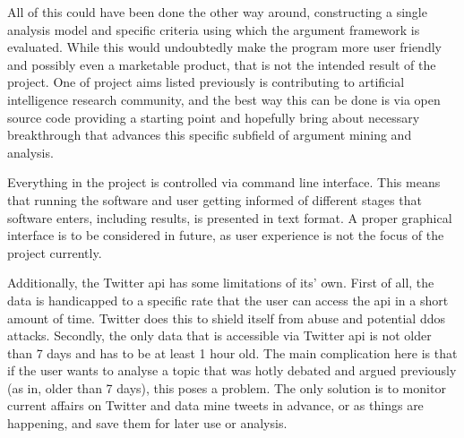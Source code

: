         All of this could have been done the other way around, constructing a single analysis model and specific criteria using which the argument framework is evaluated. While this would undoubtedly make the program more user friendly and possibly even a marketable product, that is not the intended result of the project. One of project aims listed previously is contributing to artificial intelligence research community, and the best way this can be done is via open source code providing a starting point and hopefully bring about necessary breakthrough that advances this specific subfield of argument mining and analysis.

        Everything in the project is controlled via command line interface. This means that running the software and user getting informed of different stages that software enters, including results, is presented in text format. A proper graphical interface is to be considered in future, as user experience is not the focus of the project currently.
        
        Additionally, the Twitter \gls{api} has some limitations of its' own. First of all, the data is handicapped to a specific rate that the user can access the \gls{api} in a short amount of time. Twitter does this to shield itself from abuse and potential \gls{ddos} attacks. Secondly, the only data that is accessible via Twitter \gls{api} is not older than 7 days and has to be at least 1 hour old. The main complication here is that if the user wants to analyse a topic that was hotly debated and argued previously (as in, older than 7 days), this poses a problem. The only solution is to monitor current affairs on Twitter and data mine tweets in advance, or as things are happening, and save them for later use or analysis.
